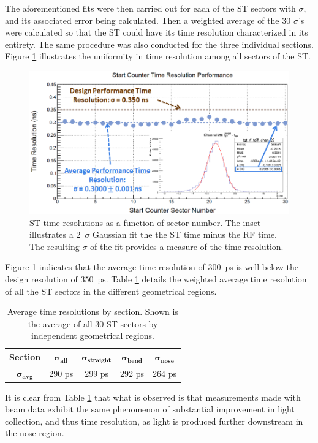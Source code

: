 The aforementioned fits were then carried out for each of the ST sectors with $\sigma$, and its associated error being calculated.  Then a weighted average of the 30 $\sigma$'s were calculated so that the ST could have its time resolution characterized in its entirety.  The same procedure was also conducted for the three individual sections.  Figure \ref{fig:timeresallinset} illustrates the uniformity in time resolution among all sectors of the ST.
	\begin{figure}[!htb]
		\centering
		\includegraphics[width=1.0\columnwidth]{performance/figs/time_res_all_inset}
		\caption{ST time resolutions as a function of sector number. The inset illustrates a 2~$\sigma$ Gaussian fit the the ST time minus the RF time. The resulting $\sigma$ of the fit provides a measure of the time resolution.}
		\label{fig:timeresallinset}
	\end{figure}

Figure \ref{fig:timeresallinset} indicates that the average time resolution of 300~ps is well below the design resolution of 350~ps.  Table \ref{tab:time_res_section} details the weighted average time resolution of all the ST sectors in the different geometrical regions.
\begin{table}[ch]
	\centering
	\begin{tabular}{|c|c|c|c|c|}
		\hline  \textbf{Section} & $\mathbf{\sigma_{all}}$ & $\mathbf{\sigma_{straight}}$ & $\mathbf{\sigma_{bend}}$ & $\mathbf{\sigma_{nose}}$ \\ 
		\hline $\mathbf{\sigma_{avg}}$ & 290 ps & 299 ps & 292 ps & 264 ps \\ 
		\hline 
	\end{tabular}
	\caption[Average time resolutions by section]{Average time resolutions by section. Shown is the average of all 30 ST sectors by independent geometrical regions.}
	\label{tab:time_res_section}
\end{table}
It is clear from Table \ref{tab:time_res_section} that what is observed is that measurements made with beam data exhibit the same phenomenon of substantial improvement in light collection, and thus time resolution, as light is produced further downstream in the nose region.

